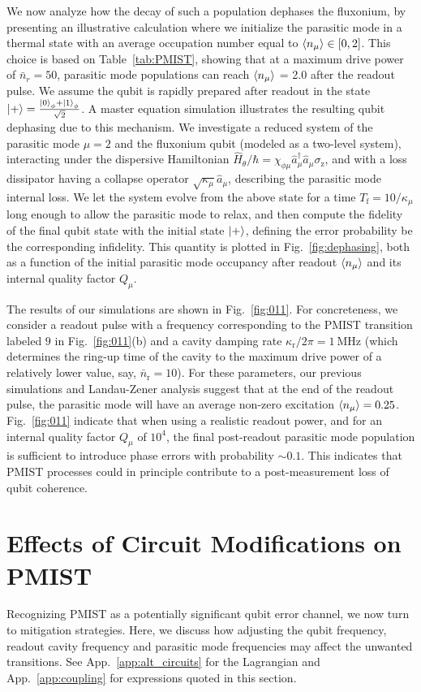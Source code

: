 \documentclass[%
reprint,
superscriptaddress,
 amsmath,amssymb,
 aps,
 prx,
longbibliography,
floatfix,
]{revtex4-2}
\begin{document}
We now analyze how the decay of such a population dephases the fluxonium, by presenting an illustrative calculation where we initialize the parasitic mode in a thermal state with an average occupation number equal to $\braket{n_\mu}\in[0,2]$. This choice is based on Table~\ref{tab:PMIST}, showing that at a maximum drive power of $\bar n_r=50$, parasitic mode populations can reach $\braket{n_\mu}$ = 2.0 after the readout pulse. We assume the qubit is rapidly prepared after readout in the state $\ket{+}=\frac{\ket{0}_\phi+\ket{1}_\phi}{\sqrt{2}}$. A master equation simulation illustrates the resulting qubit dephasing due to this mechanism. We investigate a reduced system of the parasitic mode $\mu=2$ and the fluxonium qubit (modeled as a two-level system), interacting under the dispersive Hamiltonian $\hat H_\theta/\hbar=\chi_{\phi\mu} \hat a_\mu^\dagger \hat a_\mu \sigma_\textrm{z}$, and with a loss dissipator having a collapse operator $\sqrt{\kappa_\mu}\hat a_\mu$, describing the parasitic mode internal loss. We let the system evolve from the above state for a time $T_\textrm{f}=10/\kappa_\mu$ long enough to allow the parasitic mode to relax, and then compute the fidelity of the final qubit state with the initial state $\ket{+}$, defining the error probability be the corresponding infidelity. This quantity is plotted in Fig.~\ref{fig:dephasing}, both as a function of the initial parasitic mode occupancy after readout $\braket{n_\mu}$ and its internal quality factor $Q_\mu$. 

The results of our simulations are shown in Fig.~\ref{fig:011}. For concreteness, we consider a readout pulse with a frequency corresponding to the PMIST transition labeled $9$ in Fig.~\ref{fig:011}(b) and a cavity damping rate $\kappa_\textrm{r}/2\pi=1 \ \mathrm{MHz}$ (which determines the ring-up time of the cavity to the maximum drive power of a relatively lower value, say, $\bar n_\textrm{r}=10$). For these parameters, our previous simulations and Landau-Zener analysis suggest that at the end of the readout pulse, the parasitic mode will have an average non-zero excitation $\braket{n_\mu}=0.25$. Fig.~\ref{fig:011} indicate that when using a realistic readout power, and for an internal quality factor $Q_\mu$ of $10^{4}$, the final post-readout parasitic mode population is sufficient to introduce phase errors with probability $\sim 0.1$. This indicates that PMIST processes could in principle contribute to a post-measurement loss of qubit coherence.  

\section{Effects of Circuit Modifications on PMIST}\label{sec:expressions}
Recognizing PMIST as a potentially significant qubit error channel, we now turn to mitigation strategies. Here, we discuss how adjusting the qubit frequency, readout cavity frequency and parasitic mode frequencies may affect the unwanted transitions. See App.~\ref{app:alt_circuits} for the Lagrangian and App.~\ref{app:coupling} for expressions quoted in this section.
\end{document}
